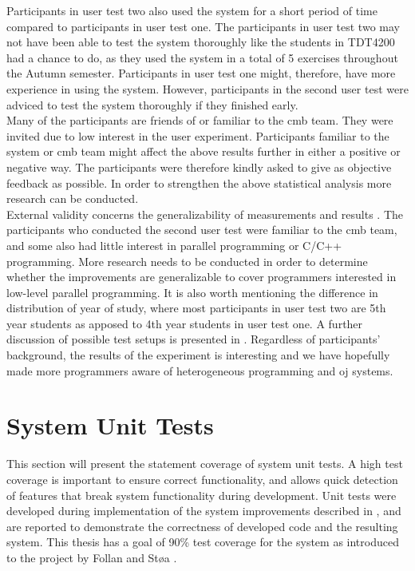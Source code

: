 Participants in user test two also used the system for a short period of time compared to participants in user test one. The participants in user test two may not have been able to test the system thoroughly like the students in TDT4200 had a chance to do, as they used the system in a total of 5 exercises throughout the Autumn semester. Participants in user test one might, therefore, have more experience in using the system. However, participants in the second user test were adviced to test the system thoroughly if they finished early.\\

Many of the participants are friends of or familiar to the \gls{cmb} team. They were invited due to low interest in the user experiment. Participants familiar to the system or \gls{cmb} team might affect the above results further in either a positive or negative way. The participants were therefore kindly asked to give as objective feedback as possible. In order to strengthen the above statistical analysis more research can be conducted. \\

External validity concerns the generalizability of measurements and results \cite{Oates2006}. The participants who conducted the second user test were familiar to the \gls{cmb} team, and some also had little interest in parallel programming or C/C++ programming. More research needs to be conducted in order to determine whether the improvements are generalizable to cover programmers interested in low-level parallel programming. It is also worth mentioning the difference in distribution of year of study, where most participants in user test two are 5th year students as apposed to 4th year students in user test one. A further discussion of possible test setups is presented in . Regardless of participants' background, the results of the experiment is interesting and we have hopefully made more programmers aware of heterogeneous programming and \gls{oj} systems. \\

\section{System Unit Tests}
\label{sec:system-unit-tests}
This section will present the statement coverage of system unit tests. A high test coverage is important to ensure correct functionality, and allows quick detection of features that break system functionality during development. Unit tests were developed during implementation of the system improvements described in , and are reported to demonstrate the correctness of developed code and the resulting system. This thesis has a goal of 90\% test coverage for the system as introduced to the project by Follan and Støa \cite{mt:T&S}. \\

